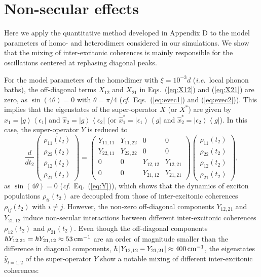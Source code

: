 \documentclass[%
 reprint,%
 amssymb, amsmath,%
 aip,cha,%
]{revtex4-1}
\newcommand{\bra}[1]{\ensuremath{\left\langle{#1}\right\vert}}
\newcommand{\ket}[1]{\ensuremath{\left|{#1}\right\rangle}}
\newcommand{\abs}[1]{\left|#1\right|}
\begin{document}
\section{Non-secular effects}
Here we apply the quantitative method developed in Appendix D to the model parameters of homo- and heterodimers considered in our simulations. We show that the mixing of inter-excitonic coherences is mainly responsible for the oscillations centered at rephasing diagonal peaks.

For the model parameters of the homodimer with $\xi=10^{-3}d$ ({\it i.e.}~local phonon baths), the off-diagonal terms $X_{12}$ and $X_{21}$ in Eqs.~(\ref{eq:X12}) and (\ref{eq:X21}) are zero, as $\sin(4\theta)=0$ with $\theta=\pi/4$ ({\it cf}.~Eqs.~(\ref{eq:evec1}) and (\ref{eq:evec2})). This implies that the eigenstates of the super-operator $X$ (or $X^{*}$) are given by $\hat{x}_1=\ket{g}\bra{\epsilon_1}$ and $\hat{x}_2=\ket{g}\bra{\epsilon_2}$ (or $\hat{x}_{1}^{*}=\ket{\epsilon_1}\bra{g}$ and $\hat{x}_{2}^{*}=\ket{\epsilon_2}\bra{g}$). In this case, the super-operator $Y$ is reduced to
\begin{equation}
\frac{d}{dt_2}
\begin{pmatrix}
\rho_{11}(t_2) \\ \rho_{22}(t_2) \\ \rho_{12}(t_2) \\ \rho_{21}(t_2)
\end{pmatrix}
=
\begin{pmatrix}
Y_{11,11} & Y_{11,22} & 0 & 0 \\
Y_{22,11} & Y_{22,22} & 0 & 0 \\
0 & 0 & Y_{12,12} & Y_{12,21} \\
0 & 0 & Y_{21,12} & Y_{21,21}
\end{pmatrix}
\begin{pmatrix}
\rho_{11}(t_2) \\ \rho_{22}(t_2) \\ \rho_{12}(t_2) \\ \rho_{21}(t_2)
\end{pmatrix},
\label{eq:nonabs}
\end{equation}
as $\sin(4\theta)=0$ ({\it cf}.~Eq.~(\ref{eq:Y})), which shows that the dynamics of exciton populations $\rho_{ii}(t_2)$ are decoupled from those of inter-excitonic coherences $\rho_{ij}(t_2)$ with $i\neq j$. However, the non-zero off-diagonal components $Y_{12,21}$ and $Y_{21,12}$ induce non-secular interactions between different inter-excitonic coherences $\rho_{12}(t_2)$ and $\rho_{21}(t_2)$. Even though the off-diagonal components $\hbar Y_{12,21}=\hbar Y_{21,12}\approx 53\,{\rm cm}^{-1}$ are an order of magnitude smaller than the difference in diagonal components, $\hbar\abs{Y_{12,12}-Y_{21,21}}\approx 400\,{\rm cm}^{-1}$, the eigenstates $\hat{y}_{l=1,2}$ of the super-operator $Y$ show a notable mixing of different inter-excitonic coherences:
\end{document}
